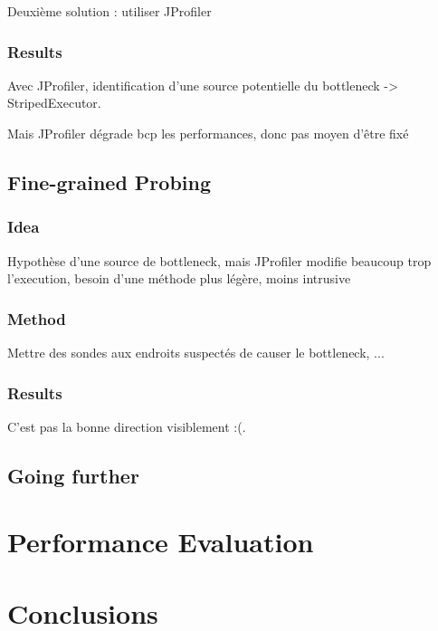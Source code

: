 \documentclass[conference]{IEEEtran}
\begin{document}
Deuxième solution : utiliser JProfiler
\subsubsection{Results}
Avec JProfiler, identification d'une source potentielle du bottleneck -> StripedExecutor.

Mais JProfiler dégrade bcp les performances, donc pas moyen d'être fixé

\subsection{Fine-grained Probing}
\subsubsection{Idea}
Hypothèse d'une source de bottleneck, mais JProfiler modifie beaucoup trop l'execution, besoin d'une méthode plus légère, moins intrusive

\subsubsection{Method}
Mettre des sondes aux endroits suspectés de causer le bottleneck, ...
\subsubsection{Results}
C'est pas la bonne direction visiblement :(.

\subsection{Going further}
\bigbreak



\bigbreak
\section{Performance Evaluation}
\bigbreak
\section{Conclusions}
\bigbreak
\end{document}
